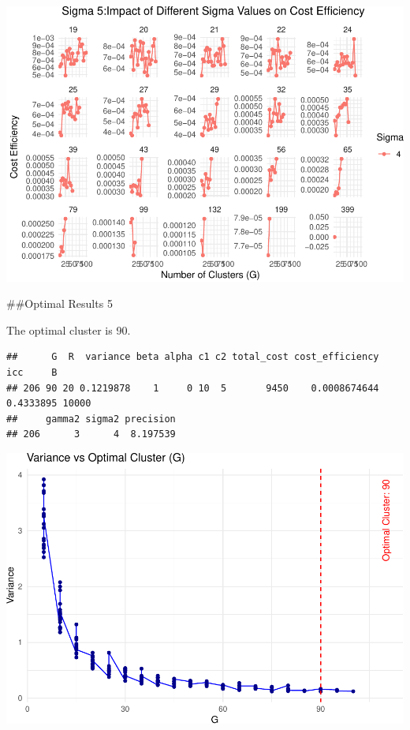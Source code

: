 \documentclass[
]{article}
\begin{document}
\begin{center}\includegraphics{Project3Simulation_files/figure-latex/unnamed-chunk-14-2} \end{center}

\#\#Optimal Results 5

The optimal cluster is 90.

\begin{verbatim}
##      G  R  variance beta alpha c1 c2 total_cost cost_efficiency       icc     B
## 206 90 20 0.1219878    1     0 10  5       9450    0.0008674644 0.4333895 10000
##     gamma2 sigma2 precision
## 206      3      4  8.197539
\end{verbatim}

\begin{center}\includegraphics{Project3Simulation_files/figure-latex/unnamed-chunk-15-1} \end{center}
\end{document}
